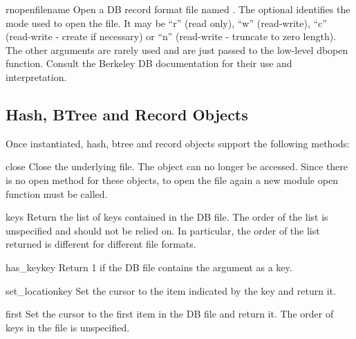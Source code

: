 \begin{funcdesc}{rnopen}{filename}
Open a DB record format file named .  The optional 
identifies the mode used to open the file.  It may be ``r'' (read only),
``w'' (read-write), ``c'' (read-write - create if necessary) or ``n''
(read-write - truncate to zero length).  The other arguments are rarely used
and are just passed to the low-level dbopen function.  Consult the
Berkeley DB documentation for their use and interpretation.
\end{funcdesc}


\begin{seealso}
\end{seealso}


\subsection{Hash, BTree and Record Objects \label{bsddb-objects}}

Once instantiated, hash, btree and record objects support the following
methods:

\begin{methoddesc}{close}{}
Close the underlying file.  The object can no longer be accessed.  Since
there is no open  method for these objects, to open the file
again a new  module open function must be called.
\end{methoddesc}

\begin{methoddesc}{keys}{}
Return the list of keys contained in the DB file.  The order of the list is
unspecified and should not be relied on.  In particular, the order of the
list returned is different for different file formats.
\end{methoddesc}

\begin{methoddesc}{has_key}{key}
Return 1 if the DB file contains the argument as a key.
\end{methoddesc}

\begin{methoddesc}{set_location}{key}
Set the cursor to the item indicated by the key and return it.
\end{methoddesc}

\begin{methoddesc}{first}{}
Set the cursor to the first item in the DB file and return it.  The order of 
keys in the file is unspecified.
\end{methoddesc}

